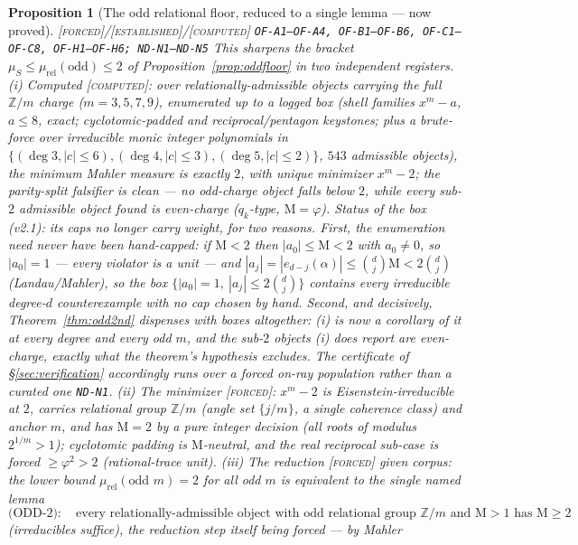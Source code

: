 \documentclass[11pt]{article}
\newcommand{\tagF}{\textcolor{cF}{\textsc{[forced]}}}
\newcommand{\tagC}{\textcolor{cC}{\textsc{[computed]}}}
\newcommand{\tagE}{\textcolor{cE}{\textsc{[established]}}}
\newcommand{\hx}[1]{\textcolor{cC}{\footnotesize\texttt{#1}}}
\newcommand{\Z}{\mathbb{Z}}
\newcommand{\gp}{\varphi}
\newcommand{\M}{\mathrm{M}}
\theoremstyle{plain}
\newtheorem{proposition}[theorem]{Proposition}
\theoremstyle{definition}
\theoremstyle{remark}
\begin{document}
\begin{proposition}[The odd relational floor, reduced to a single lemma --- now proved]\label{prop:oddfloorred}\tagF{}/\tagE{}/\tagC{} \hx{OF-A1--OF-A4, OF-B1--OF-B6, OF-C1--OF-C8, OF-H1--OF-H6; ND-N1--ND-N5}
This sharpens the bracket $\mu_S\le\mu_{\mathrm{rel}}(\text{odd})\le2$ of
Proposition~\ref{prop:oddfloor} in two independent registers.
\emph{(i) Computed} \tagC{}: over relationally-admissible objects carrying the
full $\Z/m$ charge ($m=3,5,7,9$), enumerated up to a \emph{logged} box (shell
families $x^m-a$, $a\le8$, exact; cyclotomic-padded and reciprocal/pentagon
keystones; plus a brute-force over irreducible monic integer polynomials in
$\{(\deg3,|c|\le6),(\deg4,|c|\le3),(\deg5,|c|\le2)\}$, $543$ admissible objects),
the minimum Mahler measure is \emph{exactly} $2$, with unique minimizer $x^m-2$;
the parity-split falsifier is clean --- no odd-charge object falls below $2$,
while every sub-$2$ admissible object found is even-charge ($q_k$-type,
$\M=\gp$). \emph{Status of the box (v2.1):} its caps no longer carry weight, for
two reasons. First, the enumeration need never have been hand-capped: if $\M<2$
then $|a_0|\le\M<2$ with $a_0\neq0$, so $|a_0|=1$ --- every violator is a unit
--- and $|a_j|=|e_{d-j}(\alpha)|\le\binom{d}{j}\M<2\binom{d}{j}$
(Landau/Mahler), so the box $\{|a_0|=1,\ |a_j|\le2\binom{d}{j}\}$ contains
\emph{every} irreducible degree-$d$ counterexample with no cap chosen by hand.
Second, and decisively, Theorem~\ref{thm:odd2nd} dispenses with boxes
altogether: (i) is now a \emph{corollary} of it at every degree and every odd
$m$, and the sub-$2$ objects (i) does report are even-charge, exactly what the
theorem's hypothesis excludes. The certificate of \S\ref{sec:verification}
accordingly runs over a \emph{forced} on-ray population rather than a curated
one \hx{ND-N1}. \emph{(ii) The minimizer} \tagF{}: $x^m-2$ is Eisenstein-irreducible
at $2$, carries relational group $\Z/m$ (angle set $\{j/m\}$, a single coherence
class) and anchor $m$, and has $\M=2$ by a pure integer decision (all roots of
modulus $2^{1/m}>1$); cyclotomic padding is $\M$-neutral, and the real reciprocal
sub-case is forced $\ge\gp^2>2$ (rational-trace unit). \emph{(iii) The reduction}
\tagF{}\emph{ given corpus}: the lower bound $\mu_{\mathrm{rel}}(\text{odd }m)=2$
for \emph{all} odd $m$ is \emph{equivalent} to the single named lemma
\[
\text{(ODD-2)}\colon\quad\text{every relationally-admissible object with odd
relational group }\Z/m\text{ and }\M>1\text{ has }\M\ge2
\]
(irreducibles suffice), the reduction step itself being forced --- by Mahler

\end{proposition}
\end{document}
